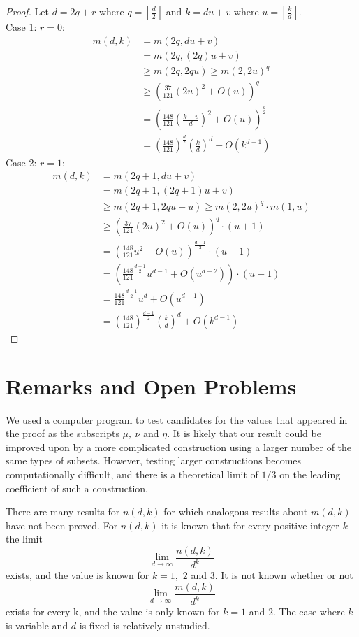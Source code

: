 \documentclass[11pt]{article}
\theoremstyle{definition}
\begin{document}
\begin{proof}
Let $d = 2q +r$ where $q =\displaystyle\left \lfloor \frac{d}{2}\right\rfloor$ and $k = du +v$ where $u =\displaystyle \left \lfloor \frac{k}{d}\right\rfloor$. \\
Case 1: $r = 0$:
\begin{align*}
m(d,k) &= m(2q, du +v)\\
&= m(2q, (2q)u +v)\\
&\geq m(2q, 2qu) \geq m(2, 2u)^q\\
&\geq \left(\frac{37}{121}(2u)^2+ O(u)\right)^q \\
&= \left(\frac{148}{121} \left(\frac{k-v}{d}\right) ^2+ O(u)\right)^{ \frac{d}{2}}\\
&= \left(\frac{148}{121}\right)^{ \frac{d}{2}}\left(\frac{k}{d}\right)^d + O(k^{d-1})
\end{align*}
Case 2: $r = 1$:
\begin{align*}
m(d,k) &= m(2q+1, du +v)\\
&= m(2q+1, (2q+1)u +v)\\
&\geq m(2q+1, 2qu + u) \geq m(2, 2u)^q \cdot m(1,u)\\
&\geq \left(\frac{37}{121}(2u)^2+ O(u)\right)^q \cdot (u+1) \\
&= \left(\frac{148}{121} u^2 + O(u)\right)^{ \frac{d-1}{2}} \cdot (u+1)\\
&= \left(\frac{148}{121}^{ \frac{d-1}{2}} u ^{d-1}+ O(u^{d-2})\right) \cdot (u+1)\\
&= \frac{148}{121}^{ \frac{d-1}{2}} u ^{d}+ O(u^{d-1})\\
&= \left(\frac{148}{121}\right)^{ \frac{d-1}{2}}\left(\frac{k}{d}\right)^d + O(k^{d-1})
\end{align*}
\end{proof}



\section{Remarks and Open Problems}

We used a computer program to test candidates for the values that appeared in the proof as the subscripts $\mu,\ \nu$ and $\eta$.  It is likely that our result could be improved upon by a more complicated construction using a larger number of the same types of subsets.  However, testing larger constructions becomes computationally difficult, and there is a theoretical limit of $1/3$ on the leading coefficient of such a construction.

There are many results for $n(d,k)$ for which analogous results about $m(d,k)$ have not been proved.
For $n(d,k)$ it is known that for every positive integer $k$ the limit 
\[
\lim_{d \to \infty}{\frac{n(d,k)}{d^k}}
\]
exists, and the value is known for $k = 1,$ $2$ and $3$.  It is not known whether or not 
\[
\lim_{d \to \infty}{\frac{m(d,k)}{d^k}}
\]
exists for every k, and the value is only known for $k = 1$ and $2$. The case where $k$ is variable and $d$ is fixed is relatively unstudied.

	
		
\end{document}
